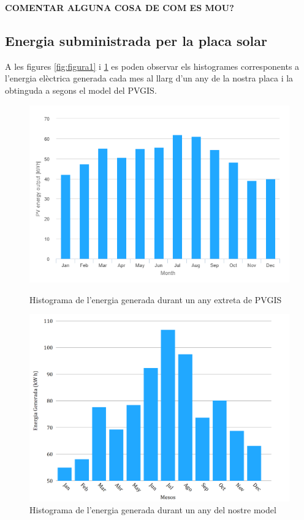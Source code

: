 \documentclass[10pt, twoside, a4paper]{article}
\begin{document}
\textbf{COMENTAR ALGUNA COSA DE COM ES MOU?}


\subsection{Energia subministrada per la placa solar}
A les figures \ref{fig:figura1} i \ref{fig:figura2} es poden observar els histogrames corresponents a l'energia elèctrica generada cada mes al llarg d'un any de la nostra placa i la obtinguda a segons el model del PVGIS. 

\begin{figure}[!ht]
    \centering
    \begin{minipage}{0.48\linewidth} 
        \centering
        \includegraphics[width=\linewidth]{Histograma_PVGIS.png}
        \caption{Histograma de l'energia generada durant un any extreta de PVGIS}
        \label{fig:figura1}
    \end{minipage}\hfill 
    \begin{minipage}{0.48\linewidth} 
        \centering
        \includegraphics[width=\linewidth]{../Mov_sol/histograma.png}
        \caption{Histograma de l'energia generada durant un any del nostre model}
        \label{fig:figura2}
    \end{minipage}
\end{figure}
\end{document}
